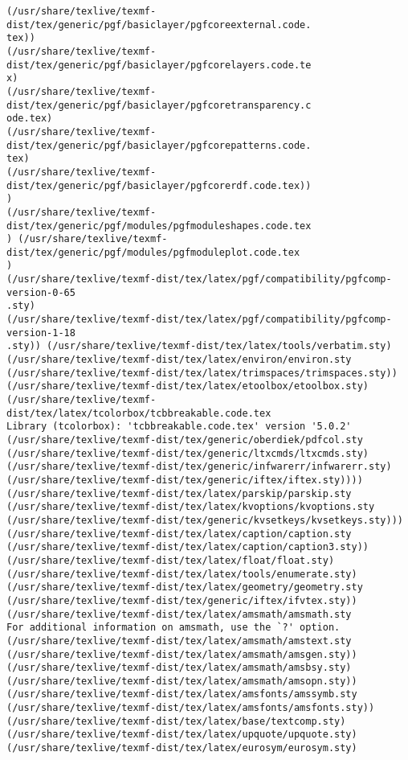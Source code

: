 \documentclass[11pt]{article}
\begin{document}
\begin{Verbatim}[commandchars=\\\{\}]
(/usr/share/texlive/texmf-dist/tex/generic/pgf/basiclayer/pgfcoreexternal.code.
tex))
(/usr/share/texlive/texmf-dist/tex/generic/pgf/basiclayer/pgfcorelayers.code.te
x)
(/usr/share/texlive/texmf-dist/tex/generic/pgf/basiclayer/pgfcoretransparency.c
ode.tex)
(/usr/share/texlive/texmf-dist/tex/generic/pgf/basiclayer/pgfcorepatterns.code.
tex)
(/usr/share/texlive/texmf-dist/tex/generic/pgf/basiclayer/pgfcorerdf.code.tex))
)
(/usr/share/texlive/texmf-dist/tex/generic/pgf/modules/pgfmoduleshapes.code.tex
) (/usr/share/texlive/texmf-dist/tex/generic/pgf/modules/pgfmoduleplot.code.tex
)
(/usr/share/texlive/texmf-dist/tex/latex/pgf/compatibility/pgfcomp-version-0-65
.sty)
(/usr/share/texlive/texmf-dist/tex/latex/pgf/compatibility/pgfcomp-version-1-18
.sty)) (/usr/share/texlive/texmf-dist/tex/latex/tools/verbatim.sty)
(/usr/share/texlive/texmf-dist/tex/latex/environ/environ.sty
(/usr/share/texlive/texmf-dist/tex/latex/trimspaces/trimspaces.sty))
(/usr/share/texlive/texmf-dist/tex/latex/etoolbox/etoolbox.sty)
(/usr/share/texlive/texmf-dist/tex/latex/tcolorbox/tcbbreakable.code.tex
Library (tcolorbox): 'tcbbreakable.code.tex' version '5.0.2'
(/usr/share/texlive/texmf-dist/tex/generic/oberdiek/pdfcol.sty
(/usr/share/texlive/texmf-dist/tex/generic/ltxcmds/ltxcmds.sty)
(/usr/share/texlive/texmf-dist/tex/generic/infwarerr/infwarerr.sty)
(/usr/share/texlive/texmf-dist/tex/generic/iftex/iftex.sty))))
(/usr/share/texlive/texmf-dist/tex/latex/parskip/parskip.sty
(/usr/share/texlive/texmf-dist/tex/latex/kvoptions/kvoptions.sty
(/usr/share/texlive/texmf-dist/tex/generic/kvsetkeys/kvsetkeys.sty)))
(/usr/share/texlive/texmf-dist/tex/latex/caption/caption.sty
(/usr/share/texlive/texmf-dist/tex/latex/caption/caption3.sty))
(/usr/share/texlive/texmf-dist/tex/latex/float/float.sty)
(/usr/share/texlive/texmf-dist/tex/latex/tools/enumerate.sty)
(/usr/share/texlive/texmf-dist/tex/latex/geometry/geometry.sty
(/usr/share/texlive/texmf-dist/tex/generic/iftex/ifvtex.sty))
(/usr/share/texlive/texmf-dist/tex/latex/amsmath/amsmath.sty
For additional information on amsmath, use the `?' option.
(/usr/share/texlive/texmf-dist/tex/latex/amsmath/amstext.sty
(/usr/share/texlive/texmf-dist/tex/latex/amsmath/amsgen.sty))
(/usr/share/texlive/texmf-dist/tex/latex/amsmath/amsbsy.sty)
(/usr/share/texlive/texmf-dist/tex/latex/amsmath/amsopn.sty))
(/usr/share/texlive/texmf-dist/tex/latex/amsfonts/amssymb.sty
(/usr/share/texlive/texmf-dist/tex/latex/amsfonts/amsfonts.sty))
(/usr/share/texlive/texmf-dist/tex/latex/base/textcomp.sty)
(/usr/share/texlive/texmf-dist/tex/latex/upquote/upquote.sty)
(/usr/share/texlive/texmf-dist/tex/latex/eurosym/eurosym.sty)

\end{Verbatim}
\end{document}
